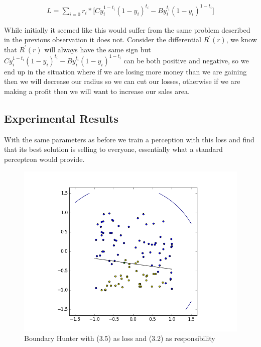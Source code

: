 \documentclass[notitlepage]{report}
\theoremstyle{definition}
\begin{document}
\begin{align}
L = \sum_{i=0} r_i * \big[Cy_i^{1-t_i}(1-y_i)^{t_i} - By_i^{t_i}(1-y_i)^{1-t_i} \big] 
\end{align}

While initially it seemed like this would suffer from the same problem described in the previous observation it does not. Consider the differential $R^{'}(r)$, we know that $R^{'}(r)$ will always have the same sign but $Cy_i^{1-t_i}(1-y_i)^{t_i} - By_i^{t_i}(1-y_i)^{1-t_i}$ can be both positive and negative, so we end up in the situation where if we are losing more money than we are gaining then we will decrease our radius so we can cut our losses, otherwise if we are making a profit then we will want to increase our sales area. 

\subsection{Experimental Results}
With the same parameters as before we train a perception with this loss and find that its best solution is selling to everyone, essentially what a standard perceptron would provide.

\begin{figure}[H]
\centering
  \begin{minipage}[b]{0.4\textwidth}
    \includegraphics[width=\textwidth]{BoundaryHunter-Attempt3-01.png}
    \caption{Boundary Hunter with (3.5) as loss and (3.2) as responsibility}
  \end{minipage}
  \hfill
\end{figure}
\end{document}
